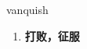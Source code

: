 
\begin{frame}
{\huge vanquish}
\begin{center}
\begin{enumerate}\Large
  \item \textbf{打败，征服}
\end{enumerate}
\end{center}
\end{frame}
